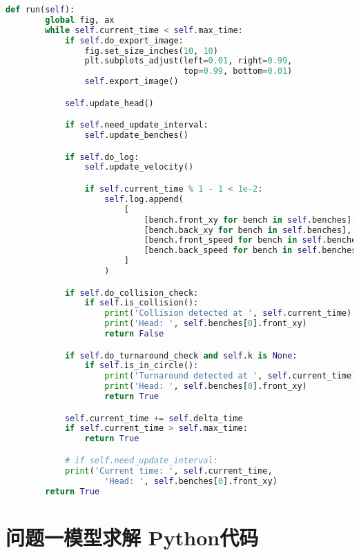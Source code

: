 \begin{lstlisting}[language=python]
    def run(self):
        global fig, ax
        while self.current_time < self.max_time:
            if self.do_export_image:
                fig.set_size_inches(10, 10)
                plt.subplots_adjust(left=0.01, right=0.99,
                                    top=0.99, bottom=0.01)
                self.export_image()

            self.update_head()

            if self.need_update_interval:
                self.update_benches()

            if self.do_log:
                self.update_velocity()

                if self.current_time % 1 - 1 < 1e-2:
                    self.log.append(
                        [
                            [bench.front_xy for bench in self.benches],
                            [bench.back_xy for bench in self.benches],
                            [bench.front_speed for bench in self.benches],
                            [bench.back_speed for bench in self.benches],
                        ]
                    )

            if self.do_collision_check:
                if self.is_collision():
                    print('Collision detected at ', self.current_time)
                    print('Head: ', self.benches[0].front_xy)
                    return False

            if self.do_turnaround_check and self.k is None:
                if self.is_in_circle():
                    print('Turnaround detected at ', self.current_time)
                    print('Head: ', self.benches[0].front_xy)
                    return True

            self.current_time += self.delta_time
            if self.current_time > self.max_time:
                return True

            # if self.need_update_interval:
            print('Current time: ', self.current_time,
                    'Head: ', self.benches[0].front_xy)
        return True
\end{lstlisting}

\section{问题一模型求解 Python代码}

